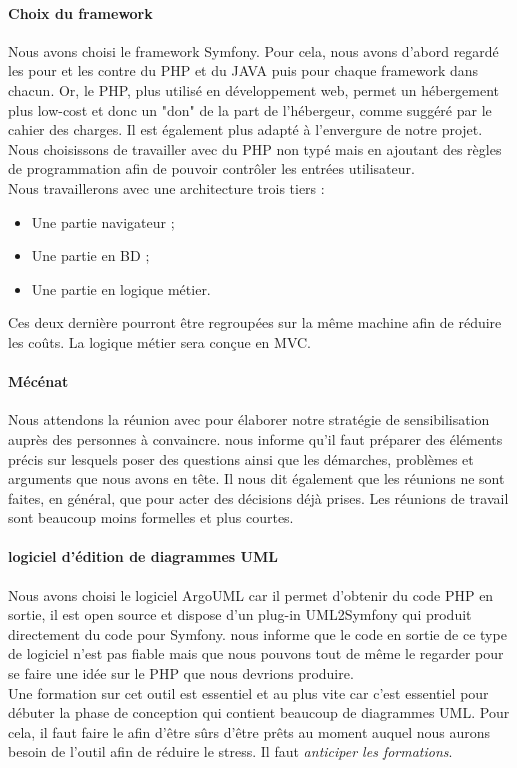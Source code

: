 \documentclass [a4paper] {article}
\begin{document}
\paragraph*{Choix du framework}
Nous avons choisi le framework Symfony. Pour cela, nous avons d'abord regardé les pour et les contre du PHP et du JAVA puis pour chaque framework dans chacun. Or, le PHP, plus utilisé en développement web, permet un hébergement plus low-cost et donc un "don" de la part de l'hébergeur, comme suggéré par le cahier des charges. Il est également plus adapté à l'envergure de notre projet.
\\
Nous choisissons de travailler avec du PHP non typé mais en ajoutant des règles de programmation afin de pouvoir contrôler les entrées utilisateur.
\\
Nous travaillerons avec une architecture trois tiers :
\begin{itemize}
\item Une partie navigateur ;
\item Une partie en BD ;
\item Une partie en logique métier.
\end{itemize}
Ces deux dernière pourront être regroupées sur la même machine afin de réduire les coûts. La logique métier sera conçue en MVC.

\paragraph*{Mécénat}
Nous attendons la réunion avec \nomTuteurCom{} pour élaborer notre stratégie de sensibilisation auprès des personnes à convaincre. \nomTuteurPedago{} nous informe qu'il faut préparer des éléments précis sur lesquels poser des questions ainsi que les démarches, problèmes et arguments que nous avons en tête. Il nous dit également que les réunions ne sont faites, en général, que pour acter des décisions déjà prises. Les réunions de travail sont beaucoup moins formelles et plus courtes.

\paragraph*{logiciel d'édition de diagrammes UML}
Nous avons choisi le logiciel ArgoUML car il permet d'obtenir du code PHP en sortie, il est open source et dispose d'un plug-in UML2Symfony qui produit directement du code pour Symfony. \nomTuteurPedago{} nous informe que le code en sortie de ce type de logiciel n'est pas fiable mais que nous pouvons tout de même le regarder pour se faire une idée sur le PHP que nous devrions produire.
\\
Une formation sur cet outil est essentiel et au plus vite car c'est essentiel pour débuter la phase de conception qui contient beaucoup de diagrammes UML. Pour cela, il faut faire le \PF{} afin d’être sûrs d’être prêts au moment auquel nous aurons besoin de l'outil afin de réduire le stress. Il faut \emph{anticiper les formations}.
\end{document}
